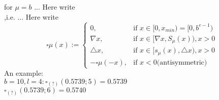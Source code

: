 \begin{itemize}
for $\mu=b$ ... Here write \\
,i.e. ... Here write \\
\[
\square \mu(x):=
	\begin{cases}
		0, & \text{if } x\in [0,x_{min})=[0,b^{e-1})\\
		\nabla x,  & \text{if } x\in [\nabla x, S_\mu(x)), x>0\\
		\triangle x,  & \text{if } x\in [s_\mu(x), \triangle x), x>0\\
		-\square \mu(-x),  & \text{if } x<0 \text{(antisymmetric)}  
	\end{cases}
\]
An example: \\
$b=10, l=4: \square_(?) (0.5739; 5)=0.5739$ \\
$\square_(?) (0.5739; 6)=0.5740$ \\


\end{itemize}
